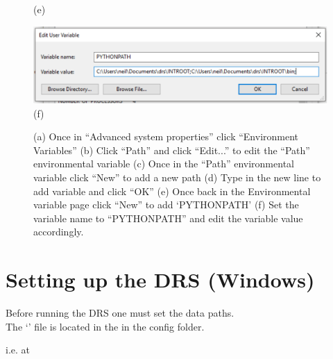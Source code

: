 \begin{figure}
\begin{center}
\begin{minipage}[t]{.29\textwidth}
\begin{center}
(e)
\end{center}
\end{minipage}
\begin{minipage}[t]{.29\textwidth}
\begin{center}
\includegraphics[width=\textwidth]{Figures/win/Win6.pdf}
(f)
\end{center}
\end{minipage}
\end{center}
\caption{(a) Once in ``Advanced system properties'' click ``Environment Variables'' (b) Click ``Path'' and click ``Edit...'' to edit the ``Path'' environmental variable (c) Once in the ``Path'' environmental variable click ``New'' to add a new path (d) Type in the new line to add variable and click ``OK'' (e) Once back in the Environmental variable page click ``New'' to add `PYTHONPATH' (f) Set the variable name to ``PYTHONPATH'' and edit the variable value accordingly. \label{figure:screengrabs} }
\end{figure}
\vspace{0.25cm}



\clearpage
\newpage
\section{Setting up the DRS (Windows)}
\label{ch:install:setup_win}

Before running the DRS one must set the data paths. \\

\noindent The `\configtxtfile' file is located in the \InstallDIR in the config folder.

i.e. at \InstallDIR{} \\

